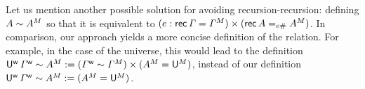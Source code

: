 Let us mention another possible solution for avoiding recursion-recursion:
defining $A\sim{A}^M$ so that it is equivalent to $(e:\mathsf{rec}\,\mathit{\Gamma}
= {\mathit{\Gamma}}^M)\times (\mathsf{rec}\,A = _{e\#}{A}^M)$.
In comparison, our approach
yields a more concise definition of the relation.
For example, in the case of the universe, this would lead
to the definition
  $  {\mathsf{U}}^{\mathsf{w}}\,{\mathit{\Gamma}}^{\mathsf{w}} \sim {A}^M := ({\mathit{\Gamma}}^{\mathsf{w}}\sim{\mathit{\Gamma}}^M) \times ({A}^M = {\mathsf{U}}^M)$,
  instead of
  our definition
  $  {\mathsf{U}}^{\mathsf{w}}\,{\mathit{\Gamma}}^{\mathsf{w}} \sim {A}^M := ({A}^M = {\mathsf{U}}^M)$.



